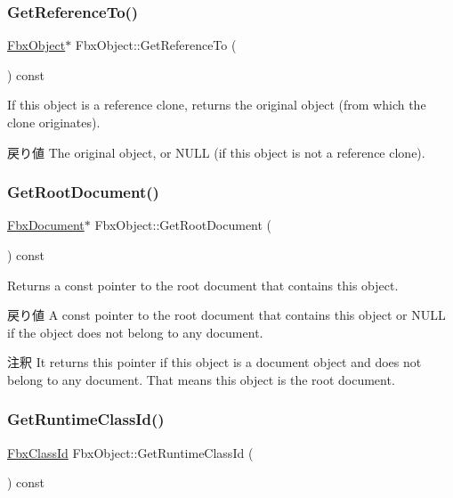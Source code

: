 \subsubsection{\texorpdfstring{Get\+Reference\+To()}{GetReferenceTo()}}
{\footnotesize\ttfamily \hyperlink{class_fbx_object}{Fbx\+Object}$\ast$ Fbx\+Object\+::\+Get\+Reference\+To (\begin{DoxyParamCaption}{ }\end{DoxyParamCaption}) const}

If this object is a reference clone, returns the original object (from which the clone originates). \begin{DoxyReturn}{戻り値}
The original object, or N\+U\+LL (if this object is not a reference clone). 
\end{DoxyReturn}
\mbox{\label{class_fbx_object_a35553dcf1f5290c92b10c7246a5d685b}} 
\subsubsection{\texorpdfstring{Get\+Root\+Document()}{GetRootDocument()}}
{\footnotesize\ttfamily \hyperlink{class_fbx_document}{Fbx\+Document}$\ast$ Fbx\+Object\+::\+Get\+Root\+Document (\begin{DoxyParamCaption}{ }\end{DoxyParamCaption}) const}

Returns a const pointer to the root document that contains this object. \begin{DoxyReturn}{戻り値}
A const pointer to the root document that contains this object or {\ttfamily N\+U\+LL} if the object does not belong to any document. 
\end{DoxyReturn}
\begin{DoxyRemark}{注釈}
It returns this pointer if this object is a document object and does not belong to any document. That means this object is the root document. 
\end{DoxyRemark}
\mbox{\label{class_fbx_object_ad81de7de1ede009e3d80361450620475}} 
\subsubsection{\texorpdfstring{Get\+Runtime\+Class\+Id()}{GetRuntimeClassId()}}
{\footnotesize\ttfamily \hyperlink{class_fbx_class_id}{Fbx\+Class\+Id} Fbx\+Object\+::\+Get\+Runtime\+Class\+Id (\begin{DoxyParamCaption}{ }\end{DoxyParamCaption}) const}

